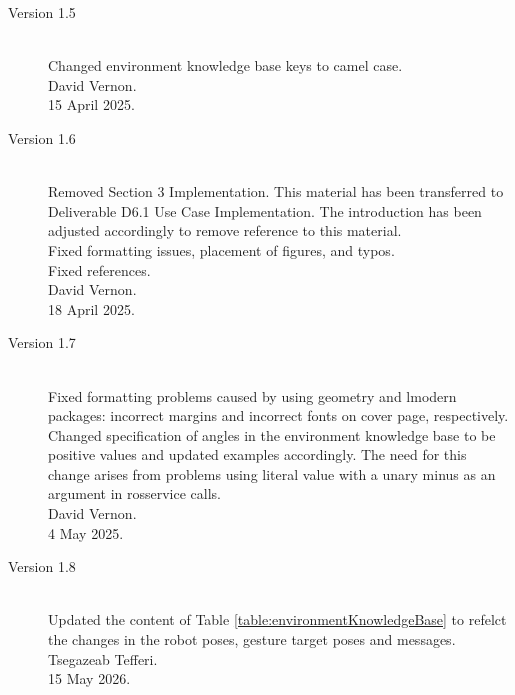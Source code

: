 \documentclass{CSSRforAfrica}
\begin{document}
\begin{description}
\item [Version 1.5]~\\
Changed environment knowledge base keys to camel case.\\
David Vernon.\\
15 April 2025.   

\newpage
\item [Version 1.6]~\\
Removed Section 3 Implementation. This material has been transferred to Deliverable D6.1 Use Case Implementation. The introduction has been adjusted accordingly to remove reference to this material.\\
Fixed formatting issues, placement of figures, and typos. \\
Fixed references.\\
David Vernon.\\
18 April 2025.  

\item [Version 1.7]~\\
Fixed formatting problems caused by using geometry and lmodern packages: incorrect margins and incorrect fonts on cover page, respectively. \\
Changed specification of angles in the environment knowledge base to be positive values and updated examples accordingly. The need for this change arises from problems using  literal value with a unary minus as an argument in rosservice calls. \\
David Vernon.\\
4 May 2025.  

\item [Version 1.8]~\\
Updated the content of Table \ref{table:environmentKnowledgeBase} to refelct the changes in the robot poses, gesture target poses and messages. \\
Tsegazeab Tefferi.\\
15 May 2026.  

\end{description}
\end{document}
